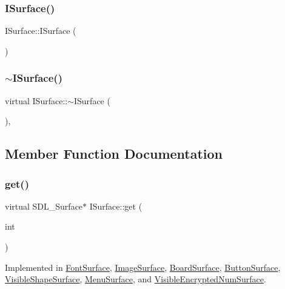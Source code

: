 \subsubsection{\texorpdfstring{I\+Surface()}{ISurface()}}
{\footnotesize\ttfamily I\+Surface\+::\+I\+Surface (\begin{DoxyParamCaption}{ }\end{DoxyParamCaption})\hspace{0.3cm}{\ttfamily [inline]}}

\mbox{\label{class_i_surface_a72497ade5e82ef16d2a3c9dfde51428a}} 
\subsubsection{\texorpdfstring{$\sim$\+I\+Surface()}{~ISurface()}}
{\footnotesize\ttfamily virtual I\+Surface\+::$\sim$\+I\+Surface (\begin{DoxyParamCaption}{ }\end{DoxyParamCaption})\hspace{0.3cm}{\ttfamily [inline]}, {\ttfamily [virtual]}}



\subsection{Member Function Documentation}
\mbox{\label{class_i_surface_a45bacb1ffa6f0835e3ece0123b90c4fc}} 
\subsubsection{\texorpdfstring{get()}{get()}}
{\footnotesize\ttfamily virtual S\+D\+L\+\_\+\+Surface$\ast$ I\+Surface\+::get (\begin{DoxyParamCaption}\item[{int}]{ }\end{DoxyParamCaption})\hspace{0.3cm}{\ttfamily [pure virtual]}}



Implemented in \mbox{\hyperlink{class_font_surface_a611d81ba179c87aef331d8b5dbef2eb6}{Font\+Surface}}, \mbox{\hyperlink{class_image_surface_a029eeccddbb6e028a4556a8c33756a56}{Image\+Surface}}, \mbox{\hyperlink{class_board_surface_a1f70650bc36f591b9a2f44576da4c77c}{Board\+Surface}}, \mbox{\hyperlink{class_button_surface_a296e13e3b1e7b0d52cfb67f6627d6f91}{Button\+Surface}}, \mbox{\hyperlink{class_visible_shape_surface_a200885c58c30916f61eebdb6c179030d}{Visible\+Shape\+Surface}}, \mbox{\hyperlink{class_menu_surface_a450caa8462abbc0202e2242f1fdd0816}{Menu\+Surface}}, and \mbox{\hyperlink{class_visible_encrypted_num_surface_a36866f967b78c3fadd234ee4ec0c9195}{Visible\+Encrypted\+Num\+Surface}}.


